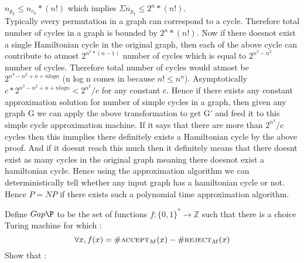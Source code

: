 \documentclass[12pt]{exam}
\begin{document}
\begin{questions}
\begin{solution}
$n_{p_k} \le n_{c_k}*(n!)$ which implies $\Sigma n_{p_k} \le 2^n*(n!)$.\\
Typically every permutation in a graph can correspond to a cycle.
Therefore total number of cycles in a graph is bounded by $2^n*(n!)$.
Now if there doesnot exist a single Hamiltonian cycle in the original graph, then
each of the above cycle can contribute to atmost $2^{n^2*(n-1)}$ number of cycles
which is equal to $2^{n^3 - n^2}$ number of cycles. Therefore total number of cycles
would atmost be $2^{n^3 - n^2 + n + nlog n}$ (n log n comes in because $n! \le n^n$).
Asymptotically $c*2^{n^3 - n^2 + n + nlog n} < 2^{n^3}/c$ for any constant c.
Hence if there exists any
constant approximation solution for number of simple cycles in a graph, then given
any graph G we can apply the above transformation to get G' and feed it to this
simple cycle approximation machine. If it says that there are more than $2^{n^3}/c$
cycles then this immplies there definitely exists a Hamiltonian cycle by the above proof.
And if it doesnt reach this much then it definitely means that there doesnt exist
as many cycles in the original graph meaning there doesnot exist a hamiltonian cycle.
Hence using the approximation algorithm we can deterministically tell whether
any input graph has a hamiltonian cycle or not. Hence $P = NP$ if there
exists such a polynomial time approximation algorithm.
\end{solution}
\question[10]
Define $Gap\P$ to be the set of functions $f : \{0,1\}^* \to \mathbb{Z}$ such that there is a choice Turing machine for which :
\[ \forall x, f(x) = \#\textrm{{\sc accept}$_M(x)$} - \#\textrm{{\sc reject}$_M(x)$} \]
Show that :
\begin{solution}
\end{solution}
\end{questions}
\end{document}
